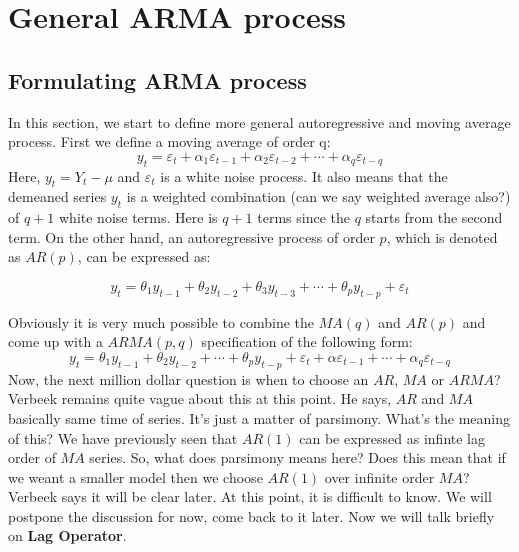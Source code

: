 \documentclass{book}
\begin{document}
\section{General ARMA process}
\subsection{Formulating ARMA process}
In this section, we start to define more general autoregressive and moving average process. First we define a moving average of order q:
\begin{equation}
	y_t=\varepsilon_t+\alpha_1 \varepsilon_{t-1}+\alpha_2 \varepsilon_{t-2}+\dotsb+\alpha_q \varepsilon_{t-q}
	\label{eq:maq}
\end{equation}
Here, $y_t=Y_t-\mu$ and $\varepsilon_t$ is a white noise process. It also means that the demeaned series $y_t$ is a weighted combination (can we say weighted average also?) of $q+1$ white noise terms. Here is $q+1$ terms since the $q$ starts from the second term. 
On the other hand, an autoregressive process of order $p$, which is denoted as $AR(p)$, can be expressed as:

\begin{equation}
    y_t=\theta_1 y_{t-1}+\theta_2 y_{t-2}+\theta_3 y_{t-3}+\dotsb+\theta_p y_{t-p}+\varepsilon_t
    \label{eq:arq}
\end{equation}

Obviously it is very much possible to combine the $MA(q)$ and $AR(p)$ and come up with a $ARMA(p,q)$ specification of the following form:
\begin{equation}
    y_t=\theta_1 y_{t-1}+\theta_2 y_{t-2}+\dotsb+\theta_p y_{t-p}+\varepsilon_t+\alpha \varepsilon_{t-1}+\dotsb+\alpha_q \varepsilon_{t-q}
\end{equation}
Now, the next million dollar question is  when to choose an $AR$, $MA$ or $ARMA$? Verbeek remains quite vague about this at this point. He says, $AR$ and $MA$ basically same time of series. It's just a matter of parsimony. What's the meaning of this? We have previously seen that $AR(1)$ can be expressed as infinte lag order of $MA$ series. So, what does parsimony means here? Does this mean that if we weant a smaller model then we choose $AR(1)$ over infinite order $MA$? Verbeek says it will be clear later. At this point, it is difficult to know. We will postpone the discussion for now, come back to it later. Now we will talk briefly on \textbf{Lag Operator}.
\end{document}
